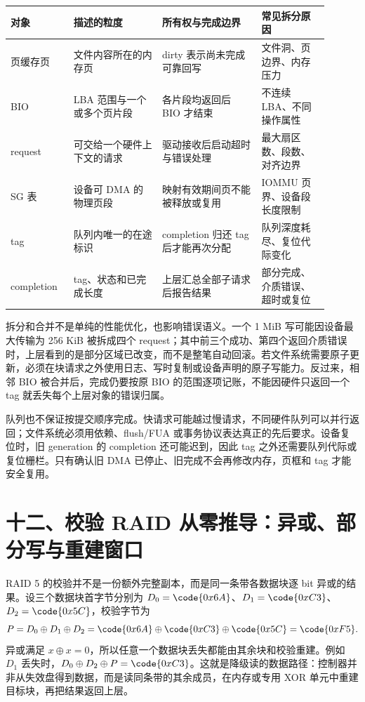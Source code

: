 \begin{longtable}{L{0.17\linewidth}L{0.25\linewidth}L{0.29\linewidth}L{0.19\linewidth}}
\toprule
对象 & 描述的粒度 & 所有权与完成边界 & 常见拆分原因 \\
\midrule
页缓存页 & 文件内容所在的内存页 & dirty 表示尚未完成可靠回写 & 文件洞、页边界、内存压力 \\\tablerowrule
BIO & LBA 范围与一个或多个页片段 & 各片段均返回后 BIO 才结束 & 不连续 LBA、不同操作属性 \\\tablerowrule
request & 可交给一个硬件上下文的请求 & 驱动接收后启动超时与错误处理 & 最大扇区数、段数、对齐边界 \\\tablerowrule
SG 表 & 设备可 DMA 的物理页段 & 映射有效期间页不能被释放或复用 & IOMMU 页界、设备段长度限制 \\\tablerowrule
tag & 队列内唯一的在途标识 & completion 归还 tag 后才能再次分配 & 队列深度耗尽、复位代际变化 \\\tablerowrule
completion & tag、状态和已完成长度 & 上层汇总全部子请求后报告结果 & 部分完成、介质错误、超时或复位 \\
\bottomrule
\end{longtable}

拆分和合并不是单纯的性能优化，也影响错误语义。一个 1 MiB 写可能因设备最大传输为 256 KiB 被拆成四个 request；其中前三个成功、第四个返回介质错误时，上层看到的是部分区域已改变，而不是整笔自动回滚。若文件系统需要原子更新，必须在块请求之外使用日志、写时复制或设备声明的原子写能力。反过来，相邻 BIO 被合并后，完成仍要按原 BIO 的范围逐项记账，不能因硬件只返回一个 tag 就丢失每个上层对象的错误归属。

队列也不保证按提交顺序完成。快请求可能越过慢请求，不同硬件队列可以并行返回；文件系统必须用依赖、flush/FUA 或事务协议表达真正的先后要求。设备复位时，旧 generation 的 completion 还可能迟到，因此 tag 之外还需要队列代际或复位栅栏。只有确认旧 DMA 已停止、旧完成不会再修改内存，页框和 tag 才能安全复用。

\section{十二、校验 RAID 从零推导：异或、部分写与重建窗口}

RAID 5 的校验并不是一份额外完整副本，而是同一条带各数据块逐 bit 异或的结果。设三个数据块首字节分别为 $D_0=\code{0x6A}$、$D_1=\code{0xC3}$、$D_2=\code{0x5C}$，校验字节为
\[
P=D_0\oplus D_1\oplus D_2
 =\code{0x6A}\oplus\code{0xC3}\oplus\code{0x5C}
 =\code{0xF5}.
\]
异或满足 $x\oplus x=0$，所以任意一个数据块丢失都能由其余块和校验重建。例如 $D_1$ 丢失时，$D_0\oplus D_2\oplus P=\code{0xC3}$。这就是降级读的数据路径：控制器并非从失效盘得到数据，而是读同条带的其余成员，在内存或专用 XOR 单元中重建目标块，再把结果返回上层。

